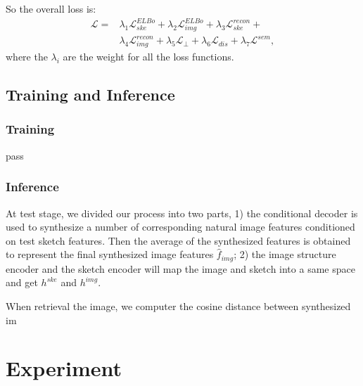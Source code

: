 \documentclass[10pt,twocolumn,letterpaper]{article}
\begin{document}
So the overall loss is:
\begin{align}
	\mathcal{L} =& \lambda_1 \mathcal{L}_{ske}^{ELBo} + \lambda_2 \mathcal{L}_{img}^{ELBo} + \lambda_3 \mathcal{L}_{ske}^{recon} + \\ &\lambda_4 \mathcal{L}_{img}^{recon} + \lambda_5 \mathcal{L}_{\perp} + \lambda_6 \mathcal{L}_{dis} + \lambda_7 \mathcal{L}^{sem}, 
\end{align}
where the $\lambda_i$ are the weight for all the loss functions.

\subsection{Training and Inference}

\subsubsection{Training}
pass

\subsubsection{Inference}
At test stage, we divided our process into two parts, 1) the conditional decoder is used to synthesize a number of corresponding natural image features conditioned on  test sketch features. Then the average of the synthesized features is obtained to represent the final synthesized image features $\hat{f}_{img}$; 2) the image structure encoder and the sketch encoder will map the image and sketch into a same space and get $h^{ske}$ and $h^{img}$.

When retrieval the image, we computer the cosine distance between synthesized im




\section{Experiment}
\end{document}
